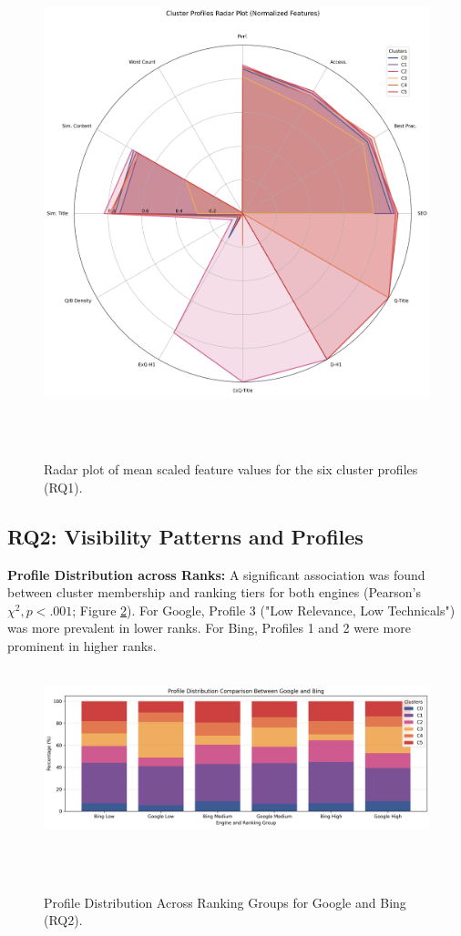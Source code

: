 \documentclass[a4paper,fleqn]{cas-sc}
\begin{document}
\begin{figure}[htbp!]
    \centering
    \includegraphics[width=1\linewidth]{figs/rq1_cluster_radar_normalized.png}
    \caption{Radar plot of mean scaled feature values for the six cluster profiles (RQ1).}
    \label{fig:rq1_cluster_radar_normalized}
\end{figure}

\subsection{RQ2: Visibility Patterns and Profiles}
\label{subsec:results_rq2}
\textbf{Profile Distribution across Ranks:} A significant association was found between cluster membership and ranking tiers for both engines (Pearson's $\chi^2, p < .001$; Figure \ref{fig:rq2_profile_dist_combined}). For Google, Profile 3 ("Low Relevance, Low Technicals") was more prevalent in lower ranks. For Bing, Profiles 1 and 2 were more prominent in higher ranks.

\begin{figure}[htbp!]
    \centering
    \includegraphics[width=1\linewidth]{figs/rq2_profile_dist_combined_grouped_bar.png}
    \caption{Profile Distribution Across Ranking Groups for Google and Bing (RQ2).}
    \label{fig:rq2_profile_dist_combined}
\end{figure}
\end{document}
